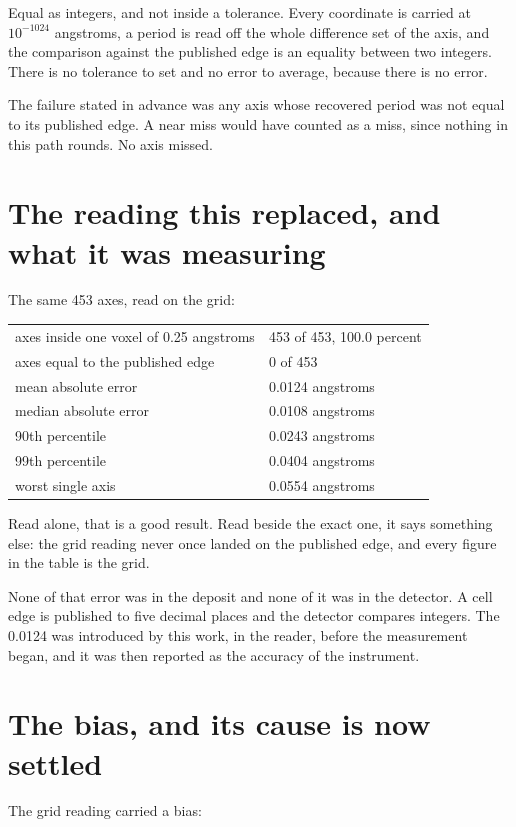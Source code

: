 Equal as integers, and not inside a tolerance. Every coordinate is carried at $10^{-1024}$ angstroms, a period is read off the whole difference set of the axis, and the comparison against the published edge is an equality between two integers. There is no tolerance to set and no error to average, because there is no error.

The failure stated in advance was any axis whose recovered period was not equal to its published edge. A near miss would have counted as a miss, since nothing in this path rounds. No axis missed.

\section{The reading this replaced, and what it was measuring}

The same 453 axes, read on the grid:

\begin{longtable}{@{}p{}p{}@{}}
\toprule
\endhead
axes inside one voxel of 0.25 angstroms & 453 of 453, 100.0 percent \\
axes equal to the published edge & 0 of 453 \\
mean absolute error & 0.0124 angstroms \\
median absolute error & 0.0108 angstroms \\
90th percentile & 0.0243 angstroms \\
99th percentile & 0.0404 angstroms \\
worst single axis & 0.0554 angstroms \\
\bottomrule
\end{longtable}

Read alone, that is a good result. Read beside the exact one, it says something else: the grid reading never once landed on the published edge, and every figure in the table is the grid.

None of that error was in the deposit and none of it was in the detector. A cell edge is published to five decimal places and the detector compares integers. The 0.0124 was introduced by this work, in the reader, before the measurement began, and it was then reported as the accuracy of the instrument.

\section{The bias, and its cause is now settled}

The grid reading carried a bias:

